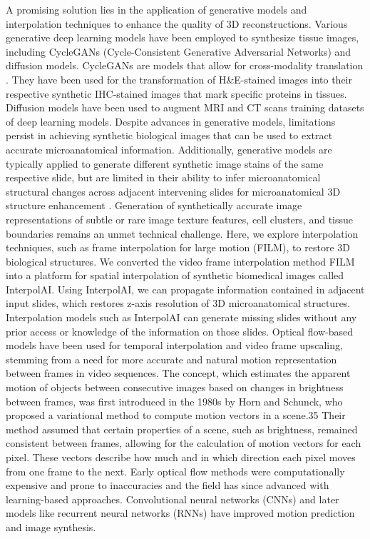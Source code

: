 \begin{refsection}
    A promising solution lies in the application of generative models and interpolation techniques to enhance the quality of 3D reconstructions. Various generative deep learning models have been employed to synthesize tissue images, including CycleGANs (Cycle-Consistent Generative Adversarial Networks) and diffusion models\cite{khader2023a,kazerouni2023a,bai-a,koivukoski2023a,kang2022a,deshpande2024a,li2023a,cross-zamirski2023a}. CycleGANs are models that allow for cross-modality translation . They have been used for the transformation of H\&E-stained images into their respective synthetic IHC-stained images that mark specific proteins in tissues\cite{bai-a,koivukoski2023a,kang2022a,xu2019a}.  Diffusion models have been used to augment MRI and CT scans training datasets of deep learning models\cite{khader2023a,li2023a,ho2020a}. 
    Despite advances in generative models, limitations persist in achieving synthetic biological images that can be used to extract accurate microanatomical information\cite{khader2023a,kazerouni2023a,bai-a,koivukoski2023a,kang2022a,deshpande2024a,li2023a,cross-zamirski2023a,gaffling-a,leng2013a,akhtar2010a}. Additionally, generative models are typically applied to generate different synthetic image stains of the same respective slide, but are limited in their ability to infer microanatomical structural changes across adjacent intervening slides for microanatomical 3D structure enhancement . Generation of synthetically accurate image representations of subtle or rare image texture features, cell clusters, and tissue boundaries remains an unmet technical challenge\cite{kazerouni2023a,deshpande2024a}. Here, we explore interpolation techniques, such as frame interpolation for large motion (FILM), to restore 3D biological structures\cite{gaffling-a,leng2013a,akhtar2010a,reda-a}. We converted the video frame interpolation method FILM into a platform for spatial interpolation of synthetic biomedical images called InterpolAI. Using InterpolAI, we can propagate information contained in adjacent input slides, which restores z-axis resolution of 3D microanatomical structures. Interpolation models such as InterpolAI can generate missing slides without any prior access or knowledge of the information on those slides.
    Optical flow-based models have been used for temporal interpolation and video frame upscaling, stemming from a need for more accurate and natural motion representation between frames in video sequences. The concept, which estimates the apparent motion of objects between consecutive images based on changes in brightness between frames, was first introduced in the 1980s by Horn and Schunck, who proposed a variational method to compute motion vectors in a scene.35 Their method assumed that certain properties of a scene, such as brightness, remained consistent between frames, allowing for the calculation of motion vectors for each pixel. These vectors describe how much and in which direction each pixel moves from one frame to the next. Early optical flow methods were computationally expensive and prone to inaccuracies and the field has since advanced with learning-based approaches. Convolutional neural networks (CNNs) and later models like recurrent neural networks (RNNs) have improved motion prediction and image synthesis\cite{hu2018a,hui2021a}.

\end{refsection}
